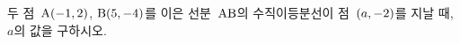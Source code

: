 두 점~$\mathrm{A}(-1{,}\mkern3mu\mathopen{}2)$, $\mathrm{B}(5{,}\mkern3mu\mathopen{}-4)$를 이은 선분~$\mathrm{AB}$의 수직이등분선이 점~$(a{,}\mkern3mu\mathopen{}-2)$를 지날 때, $a$의 값을 구하시오.
